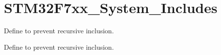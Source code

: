 \hypertarget{group___s_t_m32_f7xx___system___includes}{}\section{S\+T\+M32\+F7xx\+\_\+\+System\+\_\+\+Includes}
\label{group___s_t_m32_f7xx___system___includes}


Define to prevent recursive inclusion.  


Define to prevent recursive inclusion. 

